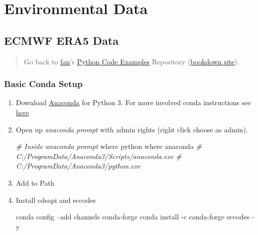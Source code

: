 \documentclass[
]{book}
\newenvironment{Shaded}{\begin{snugshade}}{\end{snugshade}}
\newcommand{\CommentTok}[1]{\textcolor[rgb]{0.56,0.35,0.01}{\textit{#1}}}
\newcommand{\ExtensionTok}[1]{#1}
\newcommand{\NormalTok}[1]{#1}
\begin{document}
\hypertarget{environmental-data}{%
\section{Environmental Data}\label{environmental-data}}

\hypertarget{ecmwf-era5-data}{%
\subsection{ECMWF ERA5 Data}\label{ecmwf-era5-data}}

\begin{quote}
Go back to \href{http://fanwangecon.github.io/}{fan}'s \href{https://fanwangecon.github.io/pyfan/}{Python Code Examples} Repository (\href{https://fanwangecon.github.io/pyfan/bookdown}{bookdown site}).
\end{quote}

\hypertarget{basic-conda-setup}{%
\subsubsection{Basic Conda Setup}\label{basic-conda-setup}}

\begin{enumerate}
\def\labelenumi{\arabic{enumi}.}
\item
  Download \href{https://www.anaconda.com/products/individual}{Anaconda} for Python 3. For more involved conda instructions see \href{https://fanwangecon.github.io/Tex4Econ/nontex/install/windows/fn_installations.html}{here}
\item
  Open up \emph{anaconda prompt} with admin rights (right click choose as admin).

\begin{Shaded}
\begin{Highlighting}[]
\CommentTok{# Inside anaconda prompt}
\ExtensionTok{where}\NormalTok{ python}
\ExtensionTok{where}\NormalTok{ anaconda}
\CommentTok{# C:/ProgramData/Anaconda3/Scripts/anaconda.exe}
\CommentTok{# C:/ProgramData/Anaconda3/python.exe}
\end{Highlighting}
\end{Shaded}
\item
  Add to Path
\item
  Install cdsapi and eccodes

\begin{Shaded}
\begin{Highlighting}[]
\ExtensionTok{conda}\NormalTok{ config --add channels conda-forge}
\ExtensionTok{conda}\NormalTok{ install -c conda-forge eccodes -y}
\end{Highlighting}
\end{Shaded}
\end{enumerate}
\end{document}
